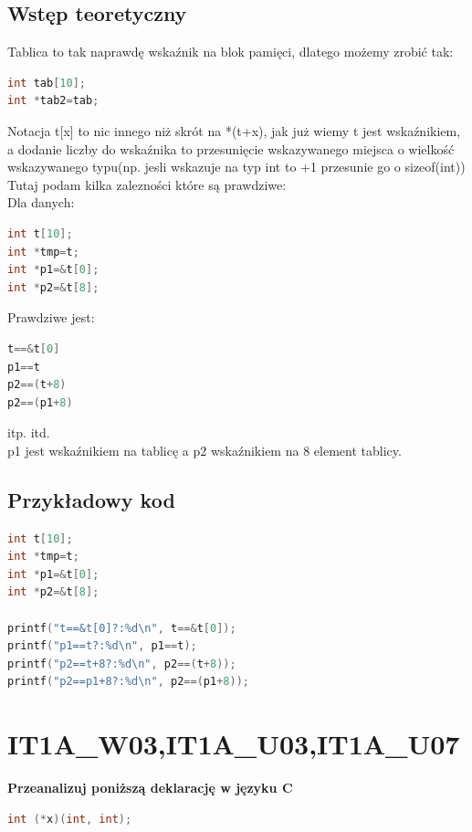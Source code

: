 \subsection{Wstęp teoretyczny}

Tablica to tak naprawdę wskaźnik na blok pamięci, dlatego możemy zrobić tak:
\begin{lstlisting}[language=c]
int tab[10];
int *tab2=tab;
\end{lstlisting}

Notacja t[x] to nic innego niż skrót na *(t+x), jak już wiemy t jest wskaźnikiem, a dodanie liczby do wskaźnika to przesunięcie wskazywanego miejsca o wielkość wskazywanego typu(np. jesli wskazuje na typ int to +1 przesunie go o sizeof(int))\\

Tutaj podam kilka zalezności które są prawdziwe:\\
Dla danych:
\begin{lstlisting}[language=c]
int t[10];
int *tmp=t;
int *p1=&t[0];
int *p2=&t[8];
\end{lstlisting}

Prawdziwe jest:
\begin{lstlisting}[language=c]
t==&t[0]
p1==t
p2==(t+8)
p2==(p1+8)
\end{lstlisting}

itp. itd.\\

p1 jest wskaźnikiem na tablicę a p2 wskaźnikiem na 8 element tablicy.

\subsection{Przykładowy kod}

\begin{lstlisting}[language=c]
int t[10];
int *tmp=t;
int *p1=&t[0];
int *p2=&t[8];

printf("t==&t[0]?:%d\n", t==&t[0]);
printf("p1==t?:%d\n", p1==t);
printf("p2==t+8?:%d\n", p2==(t+8));
printf("p2==p1+8?:%d\n", p2==(p1+8));
\end{lstlisting}


\section{IT1A\_W03,IT1A\_U03,IT1A\_U07} 
\textbf{Przeanalizuj poniższą deklarację w języku C}
\begin{lstlisting}[language=c]
int (*x)(int, int);
\end{lstlisting}

